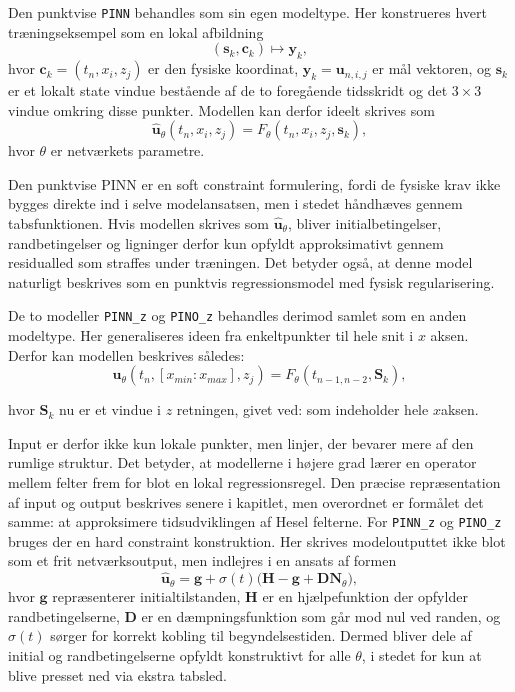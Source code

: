 Den punktvise \texttt{PINN} behandles som sin egen modeltype. Her konstrueres hvert træningseksempel som en lokal afbildning
\[
(\mathbf{s}_k,\mathbf{c}_k)\mapsto \mathbf{y}_k,
\]
hvor \(\mathbf{c}_k=(t_n,x_i,z_j)\) er den fysiske koordinat, \(\mathbf{y}_k=\mathbf{u}_{n,i,j}\) er mål vektoren, og \(\mathbf{s}_k\) er et lokalt state vindue bestående 
af de to foregående tidsskridt og det \(3\times 3\) vindue omkring disse punkter. Modellen kan derfor ideelt skrives som
\[
\hat{\mathbf{u}}_\theta(t_n, x_i,z_j)
=
F_\theta\!\left(t_n, x_i,z_j,\mathbf{s}_k\right),
\]
hvor \(\theta\) er netværkets parametre.

Den punktvise PINN er en soft constraint formulering, fordi de fysiske krav ikke bygges direkte ind i selve modelansatsen, men i stedet håndhæves gennem tabsfunktionen. Hvis modellen skrives som \(\hat{\mathbf{u}}_\theta\), bliver initialbetingelser, randbetingelser og ligninger derfor kun opfyldt approksimativt gennem residualled som straffes under træningen.
Det betyder også, at denne model naturligt beskrives som en punktvis regressionsmodel med fysisk regularisering.

De to modeller \texttt{PINN\_z} og \texttt{PINO\_z} behandles derimod samlet som en anden modeltype.
Her generaliseres ideen fra enkeltpunkter til hele snit i \(x\) aksen. Derfor kan modellen beskrives således:
\[
\hat{\mathbf{u}}_\theta(t_n,\left[x_{min}:x_{max}\right], z_j) = F_\theta\!\left(t_{n-1, n-2}, \mathbf{S}_k\right),
\]

hvor \(\mathbf{S}_k\) nu er et vindue i \(z\) retningen, givet ved: 
som indeholder hele $x$aksen.


Input er derfor ikke kun lokale punkter, men linjer, der bevarer mere af den rumlige struktur. Det betyder, at modellerne i højere grad lærer en operator mellem felter frem for blot en lokal regressionsregel. Den præcise repræsentation af input og output beskrives senere i kapitlet, men overordnet er formålet det samme: at approksimere tidsudviklingen af Hesel felterne.
For \texttt{PINN\_z} og \texttt{PINO\_z} bruges der en hard constraint konstruktion. Her skrives modeloutputtet ikke blot som et frit netværksoutput, men indlejres i en ansats af formen
\[
\hat{\mathbf{u}}_\theta = \mathbf{g} + \sigma(t)\bigl(\mathbf{H} - \mathbf{g} + \mathbf{D} \mathbf{N}_\theta\bigr),
\]
hvor \(\mathbf{g}\) repræsenterer initialtilstanden, \(\mathbf{H}\) er en hjælpefunktion der opfylder randbetingelserne, \(\mathbf{D}\) er en dæmpningsfunktion som går mod nul ved randen, og \(\sigma(t)\) sørger for korrekt kobling til begyndelsestiden. Dermed bliver dele af initial og randbetingelserne opfyldt konstruktivt for alle \(\theta\), i stedet for kun at blive presset ned via ekstra tabsled.

